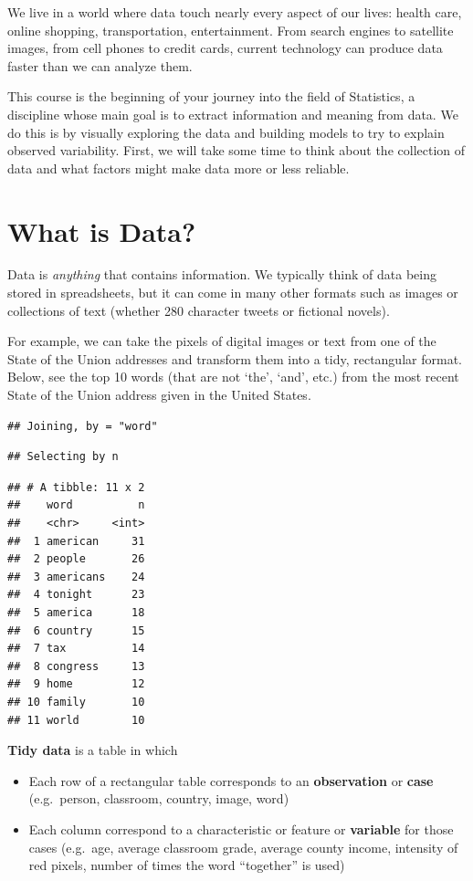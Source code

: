 \documentclass[]{book}
\providecommand{\tightlist}{%
  \setlength{\itemsep}{0pt}\setlength{\parskip}{0pt}}
\begin{document}
We live in a world where data touch nearly every aspect of our lives: health care, online shopping, transportation, entertainment. From search engines to satellite images, from cell phones to credit cards, current technology can produce data faster than we can analyze them.

This course is the beginning of your journey into the field of Statistics, a discipline whose main goal is to extract information and meaning from data. We do this is by visually exploring the data and building models to try to explain observed variability. First, we will take some time to think about the collection of data and what factors might make data more or less reliable.

\hypertarget{what-is-data}{%
\section{What is Data?}\label{what-is-data}}

Data is \emph{anything} that contains information. We typically think of data being stored in spreadsheets, but it can come in many other formats such as images or collections of text (whether 280 character tweets or fictional novels).

For example, we can take the pixels of digital images or text from one of the State of the Union addresses and transform them into a tidy, rectangular format. Below, see the top 10 words (that are not `the', `and', etc.) from the most recent State of the Union address given in the United States.

\begin{verbatim}
## Joining, by = "word"
\end{verbatim}

\begin{verbatim}
## Selecting by n
\end{verbatim}

\begin{verbatim}
## # A tibble: 11 x 2
##    word          n
##    <chr>     <int>
##  1 american     31
##  2 people       26
##  3 americans    24
##  4 tonight      23
##  5 america      18
##  6 country      15
##  7 tax          14
##  8 congress     13
##  9 home         12
## 10 family       10
## 11 world        10
\end{verbatim}

\textbf{Tidy data} is a table in which

\begin{itemize}
\tightlist
\item
  Each row of a rectangular table corresponds to an \textbf{observation} or \textbf{case} (e.g.~person, classroom, country, image, word)
\item
  Each column correspond to a characteristic or feature or \textbf{variable} for those cases (e.g.~age, average classroom grade, average county income, intensity of red pixels, number of times the word ``together'' is used)
\end{itemize}
\end{document}

